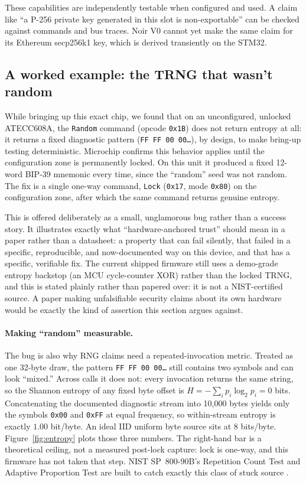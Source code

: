 \documentclass[10pt]{article}
\begin{document}
These capabilities are independently testable when configured and used. A claim like ``a P-256 private key generated in this slot is non-exportable'' can be checked against commands and bus traces. Noir V0 cannot yet make the same claim for its Ethereum secp256k1 key, which is derived transiently on the STM32.

\subsection{A worked example: the TRNG that wasn't random}
While bringing up this exact chip, we found that on an unconfigured, unlocked ATECC608A, the \texttt{Random} command (opcode \texttt{0x1B}) does not return entropy at all: it returns a fixed diagnostic pattern (\texttt{FF FF 00 00\ldots}), by design, to make bring-up testing deterministic. Microchip confirms this behavior applies until the configuration zone is permanently locked. On this unit it produced a fixed 12-word BIP-39 mnemonic every time, since the ``random'' seed was not random. The fix is a single one-way command, \texttt{Lock} (\texttt{0x17}, mode \texttt{0x80}) on the configuration zone, after which the same command returns genuine entropy.

This is offered deliberately as a small, unglamorous bug rather than a success story. It illustrates exactly what ``hardware-anchored trust'' should mean in a paper rather than a datasheet: a property that can fail silently, that failed in a specific, reproducible, and now-documented way on this device, and that has a specific, verifiable fix. The current shipped firmware still uses a demo-grade entropy backstop (an MCU cycle-counter XOR) rather than the locked TRNG, and this is stated plainly rather than papered over: it is not a NIST-certified source. A paper making unfalsifiable security claims about its own hardware would be exactly the kind of assertion this section argues against.

\paragraph{Making ``random'' measurable.} The bug is also why RNG claims need a repeated-invocation metric. Treated as one 32-byte draw, the pattern \texttt{FF FF 00 00\ldots} still contains two symbols and can look ``mixed.'' Across calls it does not: every invocation returns the same string, so the Shannon entropy of any fixed byte offset is $H = -\sum_i p_i \log_2 p_i = 0$ bits. Concatenating the documented diagnostic stream into 10{,}000 bytes yields only the symbols \texttt{0x00} and \texttt{0xFF} at equal frequency, so within-stream entropy is exactly $1.00$ bit/byte. An ideal IID uniform byte source sits at $8$ bits/byte. Figure~\ref{fig:entropy} plots those three numbers. The right-hand bar is a theoretical ceiling, not a measured post-lock capture: lock is one-way, and this firmware has not taken that step. NIST SP~800-90B's Repetition Count Test and Adaptive Proportion Test are built to catch exactly this class of stuck source \cite{nist80090b}.
\end{document}
